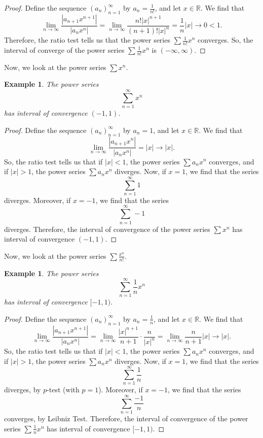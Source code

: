 \documentclass[a4paper, openany]{memoir}
\theoremstyle{definition}
\theoremstyle{plain}
\newtheorem{example}[definition]{Example}
\begin{document}
\begin{proof}
Define the sequence $(a_n)_{n=1}^{\infty}$ by $a_n = \frac{1}{n!}$, and let $x \in \mathbb{R}$. We find that
\[\lim_{n \to \infty} \frac{|a_{n+1} x^{n+1}|}{|a_n x^n|} = \lim_{n \to \infty} \frac{n! |x|^{n+1}}{(n+1)! |x|^n} = \frac{1}{n} |x| \to 0 < 1.\]
Therefore, the ratio test tells us that the power series $\sum \frac{1}{n!} x^n$ converges. So, the interval of converge of the power series $\sum \frac{1}{n!} x^n$ is $(-\infty, \infty)$.
\end{proof}
\noindent Now, we look at the power series $\sum x^n$.
\begin{example}
The power series
\[\sum_{n=1}^{\infty} x^n\]
has interval of convergence $(-1, 1)$.
\end{example}
\begin{proof}
Define the sequence $(a_n)_{n=1}^{\infty}$ by $a_n = 1$, and let $x \in \mathbb{R}$. We find that
\[\lim_{n \to \infty} \frac{|a_{n+1} x^n|}{|a_n x^n|} = |x| \to |x|.\]
So, the ratio test tells us that if $|x| < 1$, the power series $\sum a_n x^n$ converges, and if $|x| > 1$, the power series $\sum a_n x^n$ diverges. Now, if $x = 1$, we find that the series
\[\sum_{n=1}^{\infty} 1\]
diverges. Moreover, if $x = -1$, we find that the series
\[\sum_{n=1}^{\infty} -1\]
diverges. Therefore, the interval of convergence of the power series $\sum x^n$ has interval of convergence $(-1, 1)$.
\end{proof}
\noindent Now, we look at the power series $\sum \frac{x^n}{n!}$.
\begin{example}
The power series
\[\sum_{n=1}^{\infty} \frac{1}{n} x^n\]
has interval of convergence $[-1, 1)$.
\end{example}
\begin{proof}
Define the sequence $(a_n)_{n=1}^{\infty}$ by $a_n = \frac{1}{n}$, and let $x \in \mathbb{R}$. We find that
\[\lim_{n \to \infty} \frac{|a_{n+1} x^{n+1}|}{|a_n x^n|} = \lim_{n \to \infty} \frac{|x|^{n+1}}{n+1} \cdot \frac{n}{|x|^n} = \lim_{n \to \infty} \frac{n}{n+1} |x| \to |x|.\]
So, the ratio test tells us that if $|x| < 1$, the power series $\sum a_n x^n$ converges, and if $|x| > 1$, the power series $\sum a_n x^n$ diverges. Now, if $x = 1$, we find that the series
\[\sum_{n=1}^{\infty} \frac{1}{n}\]
diverges, by $p$-test (with $p = 1$). Moreover, if $x = -1$, we find that the series
\[\sum_{n=1}^{\infty} \frac{-1}{n}\]
converges, by Leibniz Test. Therefore, the interval of convergence of the power series $\sum \frac{1}{n} x^n$ has interval of convergence $[-1, 1)$.
\end{proof}
\end{document}
